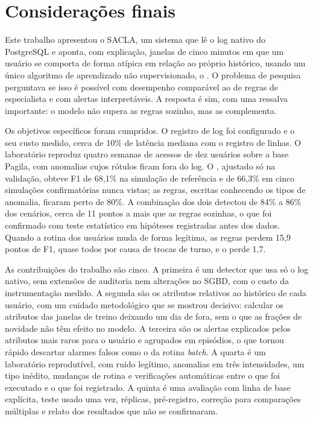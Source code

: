 
\section{Considerações finais}
\label{sec:consideracoes}

Este trabalho apresentou o SACLA, um sistema que lê o log nativo do PostgreSQL e aponta, com
explicação, janelas de cinco minutos em que um usuário se comporta de forma atípica em relação
ao próprio histórico, usando um único algoritmo de aprendizado não supervisionado, o \iforest{}.
O problema de pesquisa perguntava se isso é possível com desempenho comparável ao de regras de
especialista e com alertas interpretáveis. A resposta é sim, com uma ressalva importante: o
modelo não supera as regras sozinho, mas as complementa.

Os objetivos específicos foram cumpridos. O registro de log foi configurado e o seu custo
medido, cerca de 10\% de latência mediana com o registro de linhas. O laboratório reproduz
quatro semanas de acessos de dez usuários sobre a base Pagila, com anomalias cujos rótulos
ficam fora do log. O \iforest{}, ajustado só na validação, obteve F1 de 68,1\% na simulação de
referência e de 66,3\% em cinco simulações confirmatórias nunca vistas; as regras, escritas
conhecendo os tipos de anomalia, ficaram perto de 80\%. A combinação dos dois detectou de 84\% a
86\% dos cenários, cerca de 11 pontos a mais que as regras sozinhas, o que foi confirmado com
teste estatístico em hipóteses registradas antes dos dados. Quando a rotina dos usuários muda
de forma legítima, as regras perdem 15,9 pontos de F1, quase todos por causa de trocas de turno,
e o \iforest{} perde 1,7.

As contribuições do trabalho são cinco. A primeira é um detector que usa só o log nativo, sem
extensões de auditoria nem alterações no SGBD, com o custo da instrumentação medido. A segunda
são os atributos relativos ao histórico de cada usuário, com um cuidado metodológico que se
mostrou decisivo: calcular os atributos das janelas de treino deixando um dia de fora, sem o que
as frações de novidade não têm efeito no modelo. A terceira são os alertas explicados pelos
atributos mais raros para o usuário e agrupados em episódios, o que tornou rápido descartar
alarmes falsos como o da rotina \textit{batch}. A quarta é um laboratório reprodutível, com
ruído legítimo, anomalias em três intensidades, um tipo inédito, mudanças de rotina e
verificações automáticas entre o que foi executado e o que foi registrado. A quinta é uma
avaliação com linha de base explícita, teste usado uma vez, réplicas, pré-registro, correção
para comparações múltiplas e relato dos resultados que não se confirmaram.

